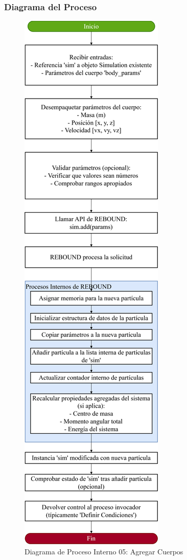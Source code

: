 \subsubsection{Diagrama del Proceso}
\begin{figure}[H]
    \centering
    \includegraphics[width=\textwidth]{img/Analisis/DiagramaProcesos/DiagramaProceso05AgregarCuerpos.png}
    \caption{Diagrama de Proceso Interno 05: Agregar Cuerpos}%
    \label{fig:process_diagram05}
\end{figure}